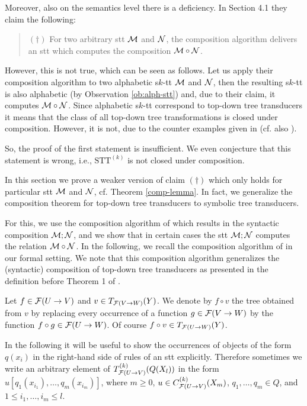 \documentclass[10pt]{scrartcl}
\newcommand{\STT}{\mathrm{STT}}
\newcommand{\M}{{\cal M}}
\newcommand{\N}{{\cal N}}
\newcommand{\F}{{\cal F}}
\def\ui#1{^{(#1)}}
\begin{document}
Moreover, also on the  semantics level there is a
deficiency. In Section 4.1 they claim the following:
\begin{quote}$(\dagger)$ For  two arbitrary stt ${\cal M}$ and ${\cal N}$,
 the composition algorithm delivers an stt which computes the
composition ${\cal M} \circ {\cal N}$. 
\end{quote}
However, this is not true, which can be seen as follows. Let us apply
their composition algorithm  to two alphabetic s$k$-tt ${\cal M}$ and ${\cal N}$, then the
resulting s$k$-tt is also alphabetic (by Observation \ref{ob:alph-stt})  and, due to their claim, it
computes ${\cal M} \circ {\cal N}$. Since alphabetic s$k$-tt correspond to top-down tree
transducers it  means that the class of all top-down tree
transformations is closed under
composition.   However, it is not, due to the counter examples given
in \cite[p 267.]{rou70} (cf. also \cite{tha70,eng75}).



  So, the proof of the first statement
is insufficient. We even conjecture that this statement is
wrong, i.e., $\STT^{(k)}$ is not closed under composition.



In this section we prove a weaker version of  claim $(\dagger)$ which
only holds for particular stt ${\cal M}$ and ${\cal N}$, cf. Theorem
\ref{comp-lemma}. In fact, we  generalize the composition theorem
\cite[Thm. 1]{bak79} for top-down tree transducers to symbolic tree transducers. 


For this, we use the composition algorithm of \cite{veabjo11b} which results
in the syntactic composition ${\cal M}; {\cal N}$, and we show that in certain cases the stt $\M;\N$ computes the relation $\M\circ \N$. In the following, we recall the composition algorithm of
\cite{veabjo11b} in our formal setting. We note that this composition
algorithm generalizes the (syntactic) composition of top-down tree
transducers as presented in the definition before Theorem 1 of \cite{bak79}.


Let $f\in \F(U\rightarrow V)$ and $v\in T_{\F(V\rightarrow W)}(Y)$. We
denote by $f \circ v$ the tree obtained from $v$ by replacing every occurrence of a function $g \in \F(V\rightarrow W)$ by the function $f \circ g \in \F(U\rightarrow W)$. Of course
$f \circ v \in T_{\F(U\rightarrow W)}(Y)$.

In the following it will be useful to show the occurrences of objects of the form $q(x_i)$ in the right-hand side of rules of an stt explicitly. Therefore sometimes
we write an arbitrary element of  $T_{\F(U \rightarrow V)}\ui k(Q(X_l))$ in the form $u[q_1(x_{i_1}),\ldots,q_m(x_{i_m})]$, where $m\geq 0$, $u \in C_{\F(U \rightarrow V)}\ui k(X_m)$, $q_1,\ldots,q_m \in Q$, and $1\le i_1,\ldots,i_m\le l$. 
\end{document}
